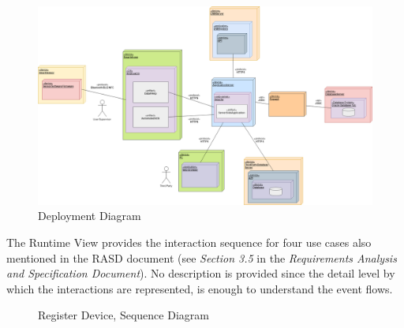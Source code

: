 \begin{flushleft}
\begin{figure}[H]
	\centering
	\includegraphics[scale=0.3]{images/uml/deployment}
	\caption{Deployment Diagram}
	\label{Figure 9}
\end{figure}
\newpage

{}
The Runtime View provides the interaction sequence for four use cases also mentioned in the RASD document (see \textit{Section 3.5} in the \textit{Requirements Analysis and Specification Document}). No description is provided since the detail level by which the interactions are represented, is enough to understand the event flows.\\

\begin{figure}[H]
	\caption{Register Device, Sequence Diagram}
	\label{Figure 10}
\end{figure}


\end{flushleft}
